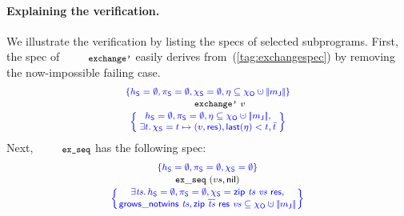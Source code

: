 
\paragraph{Explaining the verification.}
%
We illustrate the verification by listing the specs of selected
subprograms. First, the spec of $\esc{exchange'}$ easily derives
from~(\ref{tag:exchangespec}) by removing the now-impossible failing
case.
%
\[
{\small{
\begin{array}{c}
\specK{\{\heaps = \emptyset, \perms = \emptyset, \hists = \emptyset, \gist \subseteq \histo \hunion \mygather{\pending}\}}\\[2pt]
\esc{exchange'}\ v\\[2pt]
\spec{\!\!
\begin{array}{c}
\heaps = \emptyset, \perms = \emptyset, \gist \subseteq \histo \hunion \mygather{\pending}, \\[1pt]    
\exists t\ldot \hists = t \mapsto (v, \res), \mathsf{last} (\gist) < t, \twin{t}
\end{array}
\!\!}%
\end{array}
}}
\]
%
Next, $\esc{ex\_seq}$ has the following spec:
%
\[
{\small{
\begin{array}{c}
\specK{\{\heaps = \emptyset, \perms = \emptyset, \hists = \emptyset\}}\\[2pt]
\mathtt{ex\_seq}~(vs, \mathsf{nil})\\[2pt]
\spec{\!\!\!
\begin{array}{c}
\exists \ts\ldot \heaps = \emptyset, \perms = \emptyset, 
\hists = \mathsf{zip}~\ts~\vvs~\res,
\\[1pt]
\mathsf{grows\_notwins}~\ts, 
\mathsf{zip}~\overline{\ts}~\res~\vvs \subseteq \histo  \hunion \mygather{\pending}  
\end{array}
\!\!\!}%
\end{array}
}}
\]
